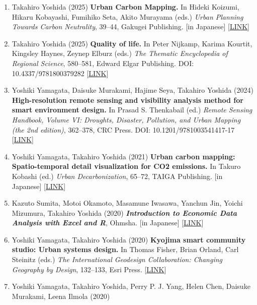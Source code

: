 \documentclass[
]{book}
\providecommand{\tightlist}{%
  \setlength{\itemsep}{0pt}\setlength{\parskip}{0pt}}
\begin{document}
\begin{enumerate}
\def\labelenumi{\arabic{enumi}.}
\tightlist
\item
  Takahiro Yoshida (2025)
  \textbf{Urban Carbon Mapping.}
  In Hideki Koizumi, Hikaru Kobayashi, Fumihiko Seta, Akito Murayama (eds.)
  \emph{Urban Planning Towards Carbon Neutrality}, 39--44, Gakugei Publishing.
  {[}in Japanese{]} {[}\href{https://book.gakugei-pub.co.jp/gakugei-book/9784761533144/}{LINK}{]}
\item
  Takahiro Yoshida (2025)
  \textbf{Quality of life.}
  In Peter Nijkamp, Karima Kourtit, Kingsley Haynes, Zeynep Elburz (eds.)
  \emph{The Thematic Encyclopedia of Regional Science}, 580--581, Edward Elgar Publishing.
  DOI: 10.4337/9781800379282 {[}\href{https://www.e-elgar.com/shop/gbp/thematic-encyclopedia-of-regional-science-9781800379275.html?srsltid=AfmBOooptnm6phReAleadX5VhoN1UoLkXsyzJf9tqskct2fYabdl7h6L}{LINK}{]}
\item
  Yoshiki Yamagata, Daisuke Murakami, Hajime Seya, Takahiro Yoshida (2024)
  \textbf{High-resolution remote sensing and visibility analysis method for smart environment design.}
  In Prasad S. Thenkabail (ed.)
  \emph{Remote Sensing Handbook, Volume VI: Droughts, Disaster, Pollution, and Urban Mapping (the 2nd edition)}, 362--378, CRC Press.
  DOI: 10.1201/9781003541417-17 {[}\href{https://doi.org/10.1201/9781003541417-17}{LINK}{]}
\item
  Yoshiki Yamagata, Takahiro Yoshida (2021)
  \textbf{Urban carbon mapping: Spatio-temporal detail visualization for CO2 emissions.}
  In Takuro Kobashi (ed.)
  \emph{Urban Decarbonization}, 65--72, TAIGA Publishing.
  {[}in Japanese{]} {[}\href{https://www.taigashuppan.co.jp/products/detail/552}{LINK}{]}
\item
  Kazuto Sumita, Motoi Okamoto, Masamune Iwasawa, Yanchun Jin, Yoichi Mizumura, Takahiro Yoshida (2020)
  \textbf{\emph{Introduction to Economic Data Analysis with Excel and R}}, Ohmsha.
  {[}in Japanese{]} {[}\href{https://www.ohmsha.co.jp/book/9784274225628/}{LINK}{]}
\item
  Yoshiki Yamagata, Takahiro Yoshida (2020)
  \textbf{Kyojima smart community studio: Urban systems design.}
  In Thomas Fisher, Brian Orland, Carl Steinitz (eds.)
  \emph{The International Geodesign Collaboration: Changing Geography by Design}, 132--133, Esri Press.
  {[}\href{https://esripress.esri.com/display/index.cfm?fuseaction=display&websiteID=388&moduleID=0}{LINK}{]}
\item
  Yoshiki Yamagata, Takahiro Yoshida, Perry P. J. Yang, Helen Chen, Daisuke Murakami, Leena Ilmola (2020)

\end{enumerate}
\end{document}
